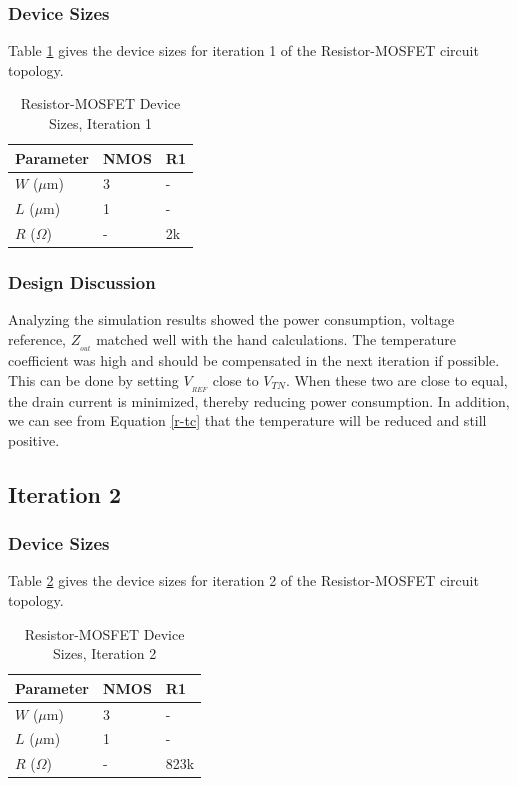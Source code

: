 \documentclass[conference]{IEEEtran}
\begin{document}
\subsubsection{Device Sizes}
Table \ref{tab:rm-ds-1} gives the device sizes for iteration 1 of the Resistor-MOSFET circuit topology.
\begin{table}[!htbp]
  \caption[]{Resistor-MOSFET Device Sizes, Iteration 1}
  \label{tab:rm-ds-1}
  \centering
  \begin{tabular}{|l|l|l|}
    \hline
    Parameter			& NMOS	&R1 \\ \hline
    $W$ ($\mu$m)		&3		&-\\ 
    $L$ ($\mu$m)		& 1		&-\\
    $R$ ($\Omega$)		&-		&2k\\
    \hline
  \end{tabular}
\end{table}
\subsubsection{Design Discussion}
Analyzing the simulation results showed the power consumption, voltage reference, $Z_{_{out}}$ matched well with the hand calculations.  The temperature coefficient was high and should be compensated in the next iteration if possible.  This can be done by setting $V_{_{REF}}$ close to $V_{TN}$.  When these two are close to equal, the drain current is minimized, thereby reducing power consumption.  In addition, we can see from Equation \ref{r-tc} that the temperature will be reduced and still positive.
\subsection{Iteration 2}
\subsubsection{Device Sizes}
Table \ref{tab:rm-ds-2} gives the device sizes for iteration 2 of the Resistor-MOSFET circuit topology. 
\begin{table}[!htbp]
  \caption[]{Resistor-MOSFET Device Sizes, Iteration 2}
  \label{tab:rm-ds-2}
  \centering
  \begin{tabular}{|l|l|l|}
    \hline
    Parameter			& NMOS	&R1 \\ \hline
    $W$ ($\mu$m)		&3		&-\\ 
    $L$ ($\mu$m)		& 1		&-\\
    $R$ ($\Omega$)		&-		&823k\\
    \hline
  \end{tabular}
\end{table}
\end{document}
